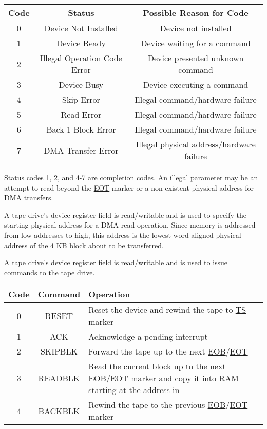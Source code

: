 \begin{center}
	\begin{tabular}{|c|c|c|}
		\hline
		Code & Status & Possible Reason for Code\\
		\hline
		\hline
		0 & Device Not Installed & Device not installed\\
		\hline
		1 & Device Ready & Device waiting for a command\\
		\hline
		2 & Illegal Operation Code Error & Device presented unknown command\\
		\hline
		3 & Device Busy & Device executing a command\\
		\hline
		4 & Skip Error & Illegal command/hardware failure\\
		\hline
		5 & Read Error & Illegal command/hardware failure\\
		\hline
		6 & Back 1 Block Error & Illegal command/hardware failure\\
		\hline
		7 & DMA Transfer Error & Illegal physical address/hardware failure\\
		\hline
	\end{tabular}
\end{center}

Status codes 1, 2, and 4-7 are completion codes. 
An illegal parameter may be an attempt to read beyond the \uline{EOT} marker or a non-existent physical address for DMA transfers.

A tape drive’s device register  field is read/writable and is used to specify the starting physical address for a DMA read operation. 
Since memory is addressed from low addresses to high, this address is the lowest word-aligned physical address of the 4 KB block about to be transferred.

A tape drive’s device register  field is read/writable and is used to issue commands to the tape drive.

\begin{center}
	\begin{tabular}{|c|c|>{\centering\arraybackslash}p{11cm}|}
		\hline
		Code & Command & Operation\\
		\hline
		\hline
		0 & RESET & Reset the device and rewind the tape to \uline{TS} marker\\
		\hline
		1 & ACK & Acknowledge a pending interrupt\\
		\hline
		2 & SKIPBLK & Forward the tape up to the next \uline{EOB}/\uline{EOT}\\
		\hline
		3 & READBLK & Read the current block up to the next \uline{EOB}/\uline{EOT} marker and copy it into RAM starting at the address in \register{DATA0}\\
		\hline
		4 & BACKBLK & Rewind the tape to the previous \uline{EOB}/\uline{EOT} marker\\
		\hline
	\end{tabular}
\end{center}

